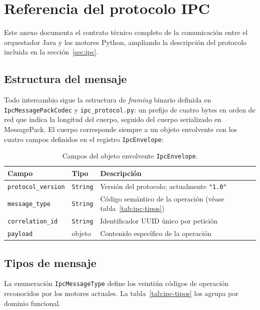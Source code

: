 \chapter{Referencia del protocolo IPC}
\label{anx:ipc}

Este anexo documenta el contrato técnico completo de la comunicación entre el orquestador Java y los motores Python, ampliando la descripción del protocolo incluida en la sección~\ref{sec:ipc}.

\section*{Estructura del mensaje}

Todo intercambio sigue la estructura de \textit{framing} binario definida en \texttt{IpcMessagePackCodec} y \texttt{ipc\_protocol.py}: un prefijo de cuatro bytes en orden de red que indica la longitud del cuerpo, seguido del cuerpo serializado en MessagePack. El cuerpo corresponde siempre a un objeto envolvente con los cuatro campos definidos en el registro \texttt{IpcEnvelope}:

\begin{table}[h]
\centering
\caption{Campos del objeto envolvente \texttt{IpcEnvelope}.}
\label{tab:ipc-envelope}
\begin{tabular}{@{}lll@{}}
\toprule
\textbf{Campo} & \textbf{Tipo} & \textbf{Descripción} \\
\midrule
\texttt{protocol\_version} & \texttt{String} & Versión del protocolo; actualmente \texttt{"1.0"} \\
\texttt{message\_type}     & \texttt{String} & Código semántico de la operación (véase tabla~\ref{tab:ipc-tipos}) \\
\texttt{correlation\_id}   & \texttt{String} & Identificador UUID único por petición \\
\texttt{payload}           & objeto          & Contenido específico de la operación \\
\bottomrule
\end{tabular}
\end{table}

\section*{Tipos de mensaje}

La enumeración \texttt{IpcMessageType} define los veintiún códigos de operación reconocidos por los motores actuales. La tabla~\ref{tab:ipc-tipos} los agrupa por dominio funcional.

